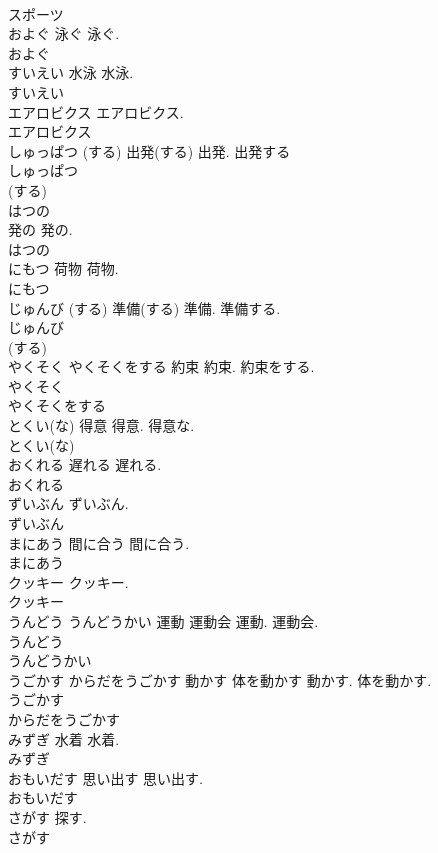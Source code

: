 \documentclass[8pt]{extreport}
\begin{document}
\begin{CJK}{UTF8}{min}
\\	スポーツ
\\	およぐ	泳ぐ	泳ぐ.	
\\	およぐ
\\	すいえい	水泳	水泳.	
\\	すいえい
\\	エアロビクス		エアロビクス.	
\\	エアロビクス
\\	しゅっぱつ (する)	出発(する)	出発. 出発する	
\\	しゅっぱつ
\\	(する)
\\	はつの	
\\	発の	発の.	
\\	はつの
\\	にもつ	荷物	荷物.	
\\	にもつ
\\	じゅんび (する)	準備(する)	準備. 準備する.	
\\	じゅんび
\\	(する)
\\	やくそく やくそくをする	約束	約束. 約束をする.	
\\	やくそく
\\	やくそくをする
\\	とくい(な)	得意	得意. 得意な.	
\\	とくい(な)
\\	おくれる	遅れる	遅れる.	
\\	おくれる
\\	ずいぶん		ずいぶん.	
\\	ずいぶん
\\	まにあう	間に合う	間に合う.	
\\	まにあう
\\	クッキー		クッキー.	
\\	クッキー
\\	うんどう うんどうかい	運動 運動会	運動. 運動会.	
\\	うんどう
\\	うんどうかい
\\	うごかす からだをうごかす	動かす 体を動かす	動かす. 体を動かす.	
\\	うごかす
\\	からだをうごかす
\\	みずぎ	水着	水着.	
\\	みずぎ
\\	おもいだす	思い出す	思い出す.	
\\	おもいだす
\\	さがす		探す.	
\\	さがす

\end{CJK}
\end{document}
